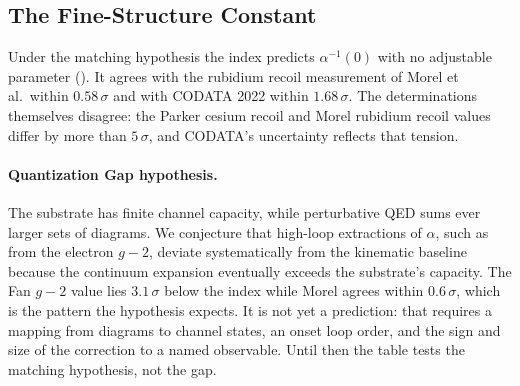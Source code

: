 \subsection{The Fine-Structure Constant}
\label{sec:fine_structure}
\begin{table}[t]
\centering
{}
\caption{$Z_{\rm geo}$ against determinations of $\alpha^{-1}(0)$. Deviations use the certified value of $Z_{\rm geo}$ and each source's quoted uncertainty (Lean: \texttt{alpha\_deviations}).}
\label{tab:alpha_comparison}
\end{table}
Under the matching hypothesis the index predicts $\alpha^{-1}(0)$ with no adjustable parameter (). It agrees with the rubidium recoil measurement of Morel et al.\ within $0.58\,\sigma$ and with CODATA 2022 within $1.68\,\sigma$. The determinations themselves disagree: the Parker cesium recoil and Morel rubidium recoil values differ by more than $5\,\sigma$, and CODATA's uncertainty reflects that tension.

\paragraph{Quantization Gap hypothesis.} The substrate has finite channel capacity, while perturbative QED sums ever larger sets of diagrams. We conjecture that high-loop extractions of $\alpha$, such as from the electron $g-2$, deviate systematically from the kinematic baseline because the continuum expansion eventually exceeds the substrate's capacity. The Fan $g-2$ value lies $3.1\,\sigma$ below the index while Morel agrees within $0.6\,\sigma$, which is the pattern the hypothesis expects. It is not yet a prediction: that requires a mapping from diagrams to channel states, an onset loop order, and the sign and size of the correction to a named observable. Until then the table tests the matching hypothesis, not the gap.

